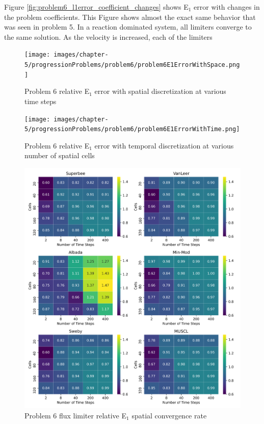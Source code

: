 Figure \ref{fig:problem6_l1error_coefficient_changes} shows E${}_{1}$ error with changes in the problem coefficients. This Figure shows almost the exact same behavior that was seen in problem 5. In a reaction dominated system, all limiters converge to the same solution. As the velocity is increased, each of the limiters 

\clearpage

\begin{figure}[p]
    \centering
    \texttt{[image: images/chapter-5/progressionProblems/problem6/problem6E1ErrorWithSpace.png]}
    \caption{Problem 6 relative E${}_{1}$ error with spatial discretization at various time steps}
    \label{fig:problem6_l1error_spatial_results}
\end{figure}

\clearpage

\begin{figure}[p]
    \centering
    \texttt{[image: images/chapter-5/progressionProblems/problem6/problem6E1ErrorWithTime.png]}
    \caption{Problem 6 relative E${}_{1}$ error with temporal discretization at various number of spatial cells}
    \label{fig:problem6_l1error_time_results}
\end{figure}

\clearpage

\begin{figure}[p]
    \centering
    \includegraphics[width=6in]{images/chapter-5/progressionProblems/problem6/problem6E1FluxLimiterConvergenceRate.png}
    \caption{Problem 6 flux limiter relative E${}_{1}$ spatial convergence rate}
    \label{fig:problem6_l1error_fluxlimiter_convergence_rate}
\end{figure}

